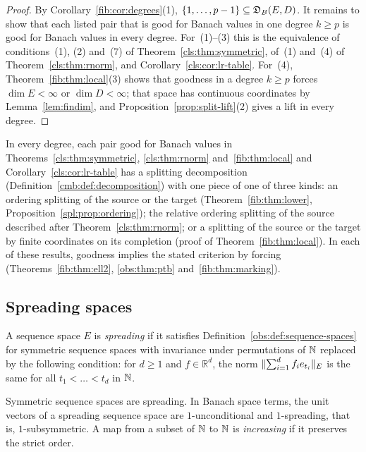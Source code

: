 \begin{proof}
By Corollary~\ref{fib:cor:degrees}(1), $\{1,\dots,p-1\}\subseteq\mathfrak D_B(E,D)$. It remains to show that each listed pair
that is good for Banach values in one degree $k\ge p$ is good for Banach values in every degree. For~(1)--(3) this is the
equivalence of conditions~(1), (2) and~(7) of Theorem~\ref{cls:thm:symmetric}, of~(1) and~(4) of
Theorem~\ref{cls:thm:rnorm}, and Corollary~\ref{cls:cor:lr-table}. For~(4), Theorem~\ref{fib:thm:local}(3) shows that
goodness in a degree $k\ge p$ forces $\dim E<\infty$ or $\dim D<\infty$; that space has continuous coordinates by
Lemma~\ref{lem:findim}, and Proposition~\ref{prop:split-lift}(2) gives a lift in every degree.
\end{proof}

\begin{remark}[mechanisms]\label{cls:rem:mechanisms}
In every degree, each pair good for Banach values in Theorems~\ref{cls:thm:symmetric}, \ref{cls:thm:rnorm}
and~\ref{fib:thm:local} and Corollary~\ref{cls:cor:lr-table} has a splitting decomposition
(Definition~\ref{cmb:def:decomposition}) with one piece of one of three kinds: an ordering splitting of the source or the
target (Theorem~\ref{fib:thm:lower}, Proposition~\ref{spl:prop:ordering}); the relative ordering splitting of the source
described after Theorem~\ref{cls:thm:rnorm}; or a splitting of the source or the target by finite coordinates on its
completion (proof of Theorem~\ref{fib:thm:local}). In each of these results, goodness implies the stated criterion by
forcing (Theorems~\ref{fib:thm:ell2}, \ref{obs:thm:ptb} and~\ref{fib:thm:marking}).
\end{remark}

\subsection{Spreading spaces}\label{cls:ssec:spreading}

\begin{definition}\label{cls:def:spreading}
A sequence space $E$ is \emph{spreading} if it satisfies Definition~\ref{obs:def:sequence-spaces} for symmetric
sequence spaces with invariance under permutations of $\mathbb N$ replaced by the following condition: for $d\ge1$ and
$f\in\mathbb R^d$, the norm $\lVert \sum_{i=1}^df_ie_{t_i}\rVert_E$ is the same for all $t_1<\dots<t_d$ in $\mathbb N$.
\end{definition}

Symmetric sequence spaces are spreading. In Banach space terms, the unit vectors of a spreading sequence space are
$1$\nobreakdash-unconditional and $1$\nobreakdash-spreading, that is, $1$\nobreakdash-subsymmetric. A map from a subset of
$\mathbb N$ to $\mathbb N$ is \emph{increasing} if it preserves the strict order.

